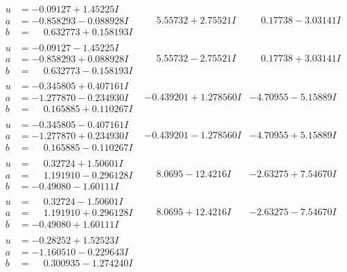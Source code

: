 \documentclass[1p]{elsarticle_modified}
\theoremstyle{definition}
\begin{document}
$$\begin{array}{c|c|c}
\begin{aligned}
u &= -0.09127 + 1.45225 I \\
a &= -0.858293 - 0.088928 I \\
b &= \phantom{-}0.632773 + 0.158193 I\end{aligned}
 & \phantom{-}5.55732 + 2.75521 I & \phantom{-}0.17738 - 3.03141 I \\ \hline\begin{aligned}
u &= -0.09127 - 1.45225 I \\
a &= -0.858293 + 0.088928 I \\
b &= \phantom{-}0.632773 - 0.158193 I\end{aligned}
 & \phantom{-}5.55732 - 2.75521 I & \phantom{-}0.17738 + 3.03141 I \\ \hline\begin{aligned}
u &= -0.345805 + 0.407161 I \\
a &= -1.277870 - 0.234930 I \\
b &= \phantom{-}0.165885 + 0.110267 I\end{aligned}
 & -0.439201 + 1.278560 I & -4.70955 - 5.15889 I \\ \hline\begin{aligned}
u &= -0.345805 - 0.407161 I \\
a &= -1.277870 + 0.234930 I \\
b &= \phantom{-}0.165885 - 0.110267 I\end{aligned}
 & -0.439201 - 1.278560 I & -4.70955 + 5.15889 I \\ \hline\begin{aligned}
u &= \phantom{-}0.32724 + 1.50601 I \\
a &= \phantom{-}1.191910 - 0.296128 I \\
b &= -0.49080 - 1.60111 I\end{aligned}
 & \phantom{-}8.0695 - 12.4216 I & -2.63275 + 7.54670 I \\ \hline\begin{aligned}
u &= \phantom{-}0.32724 - 1.50601 I \\
a &= \phantom{-}1.191910 + 0.296128 I \\
b &= -0.49080 + 1.60111 I\end{aligned}
 & \phantom{-}8.0695 + 12.4216 I & -2.63275 - 7.54670 I \\ \hline\begin{aligned}
u &= -0.28252 + 1.52523 I \\
a &= -1.160510 - 0.229643 I \\
b &= \phantom{-}0.300935 - 1.274240 I\end{aligned}

\end{array}$$
\end{document}
